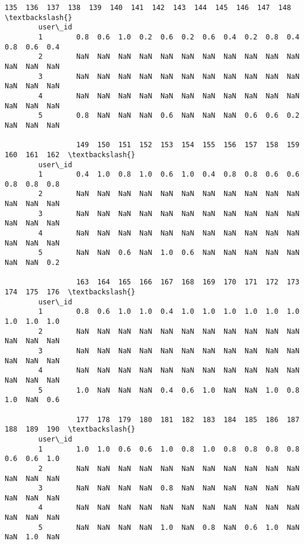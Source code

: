 \documentclass[11pt]{article}
\begin{document}
\begin{Verbatim}[commandchars=\\\{\}]
                 135  136  137  138  139  140  141  142  143  144  145  146  147  148  \textbackslash{}
        user\_id                                                                         
        1        0.8  0.6  1.0  0.2  0.6  0.2  0.6  0.4  0.2  0.8  0.4  0.8  0.6  0.4   
        2        NaN  NaN  NaN  NaN  NaN  NaN  NaN  NaN  NaN  NaN  NaN  NaN  NaN  NaN   
        3        NaN  NaN  NaN  NaN  NaN  NaN  NaN  NaN  NaN  NaN  NaN  NaN  NaN  NaN   
        4        NaN  NaN  NaN  NaN  NaN  NaN  NaN  NaN  NaN  NaN  NaN  NaN  NaN  NaN   
        5        0.8  NaN  NaN  NaN  0.6  NaN  NaN  NaN  0.6  0.6  0.2  NaN  NaN  NaN   
        
                 149  150  151  152  153  154  155  156  157  158  159  160  161  162  \textbackslash{}
        user\_id                                                                         
        1        0.4  1.0  0.8  1.0  0.6  1.0  0.4  0.8  0.8  0.6  0.6  0.8  0.8  0.8   
        2        NaN  NaN  NaN  NaN  NaN  NaN  NaN  NaN  NaN  NaN  NaN  NaN  NaN  NaN   
        3        NaN  NaN  NaN  NaN  NaN  NaN  NaN  NaN  NaN  NaN  NaN  NaN  NaN  NaN   
        4        NaN  NaN  NaN  NaN  NaN  NaN  NaN  NaN  NaN  NaN  NaN  NaN  NaN  NaN   
        5        NaN  NaN  0.6  NaN  1.0  0.6  NaN  NaN  NaN  NaN  NaN  NaN  NaN  0.2   
        
                 163  164  165  166  167  168  169  170  171  172  173  174  175  176  \textbackslash{}
        user\_id                                                                         
        1        0.8  0.6  1.0  1.0  0.4  1.0  1.0  1.0  1.0  1.0  1.0  1.0  1.0  1.0   
        2        NaN  NaN  NaN  NaN  NaN  NaN  NaN  NaN  NaN  NaN  NaN  NaN  NaN  NaN   
        3        NaN  NaN  NaN  NaN  NaN  NaN  NaN  NaN  NaN  NaN  NaN  NaN  NaN  NaN   
        4        NaN  NaN  NaN  NaN  NaN  NaN  NaN  NaN  NaN  NaN  NaN  NaN  NaN  NaN   
        5        1.0  NaN  NaN  NaN  0.4  0.6  1.0  NaN  NaN  1.0  0.8  1.0  NaN  0.6   
        
                 177  178  179  180  181  182  183  184  185  186  187  188  189  190  \textbackslash{}
        user\_id                                                                         
        1        1.0  1.0  0.6  0.6  1.0  0.8  1.0  0.8  0.8  0.8  0.8  0.6  0.6  1.0   
        2        NaN  NaN  NaN  NaN  NaN  NaN  NaN  NaN  NaN  NaN  NaN  NaN  NaN  NaN   
        3        NaN  NaN  NaN  NaN  0.8  NaN  NaN  NaN  NaN  NaN  NaN  NaN  NaN  NaN   
        4        NaN  NaN  NaN  NaN  NaN  NaN  NaN  NaN  NaN  NaN  NaN  NaN  NaN  NaN   
        5        NaN  NaN  NaN  NaN  1.0  NaN  0.8  NaN  0.6  1.0  NaN  NaN  1.0  NaN   
        

\end{Verbatim}
\end{document}
